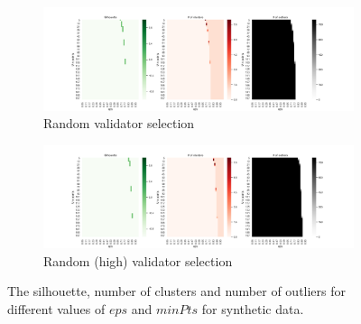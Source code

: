 \documentclass{article}
\begin{document}
\begin{figure}
     \begin{subfigure}[b]{\textwidth}
         \centering
         \includegraphics[width=\textwidth]{figures/Rand.png}
         \caption{Random validator selection}
         \label{fig:DBRAN}
     \end{subfigure}
         \hfill
     \begin{subfigure}[b]{\textwidth}
         \centering
         \includegraphics[width=\textwidth]{figures/RandHigh.png}
         \caption{Random (high) validator selection}
         \label{fig:DBRANH}
     \end{subfigure}
        \caption{The silhouette, number of clusters and number of outliers for different values of $eps$ and $minPts$ for synthetic data.}
        \label{fig:dbRan}
\end{figure}
\end{document}
